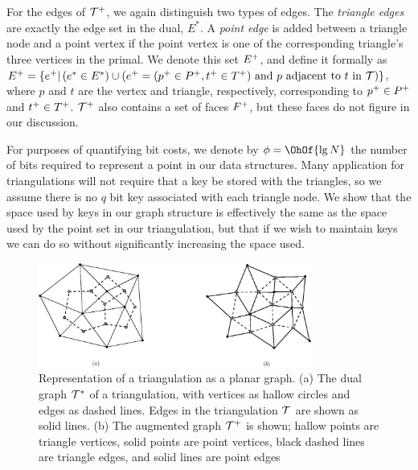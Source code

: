 For the edges of $\mathcal{T}^+$, we again distinguish two types
 of edges. 
The \emph{triangle edges} are exactly the edge set in the dual, $E^*$. 
A \emph{point edge} is added between a triangle node and a point vertex
 if the point vertex is one of the corresponding triangle's three vertices in 
 the primal. 
We denote this set $E^+$, and define it formally as
$E^+ = \{e^+ | \left( e^* \in E^* \right)
 \cup \left( e^+=( p^+ \in P^+, 
  t^+ \in T^+ ) \text{ and } p 
  \text{ adjacent to } t \text{ in } \mathcal{T} \right) \} $,
where $p$ and $t$ are the vertex and triangle, respectively, corresponding to 
$p^+ \in P^+$ and $t^{+} \in T^{+}$. 
$\mathcal{T}^+$ also contains a set of faces $F^{+}$, but these faces 
do not figure in our discussion. 


For purposes of quantifying bit costs, we denote by $\bitsPerPoint = \OhOf{\lg{N}}$ 
the number of bits required to represent a point in our data structures. 
Many application for triangulations will not require that a key be stored 
with the triangles, so we assume there is no $q$ bit key associated 
with each triangle node. 
We show that the space used by keys in our graph structure is effectively 
the same as the space used by the point set in our triangulation, but that 
if we wish to maintain keys we can do so without significantly increasing 
the space used.

\begin{figure}
\centering
	\includegraphics[width=0.8\textwidth]{Fig4}
\caption[Representation of a triangulation as a planar graph]{Representation 
	of a triangulation as a planar graph. 
  (a) The dual graph $\mathcal{T}^*$ of a triangulation, with vertices as hallow 
circles and edges as dashed lines. 
Edges in the triangulation $\mathcal{T}$ are shown as solid lines. 
(b) The augmented graph $\mathcal{T}^+$ is shown;
hallow points are triangle vertices, solid points are point 
vertices, black dashed lines are triangle edges, and solid lines are point 
edges }\label{fig:aug_tri}
\end{figure}


